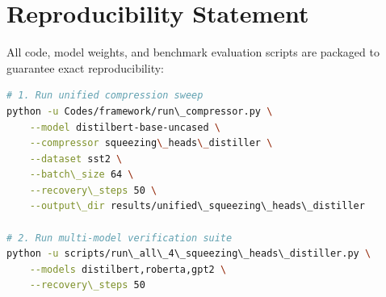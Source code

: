 \section{Reproducibility Statement}
All code, model weights, and benchmark evaluation scripts are packaged to guarantee exact reproducibility:
\begin{lstlisting}[language=bash]
# 1. Run unified compression sweep
python -u Codes/framework/run\_compressor.py \
    --model distilbert-base-uncased \
    --compressor squeezing\_heads\_distiller \
    --dataset sst2 \
    --batch\_size 64 \
    --recovery\_steps 50 \
    --output\_dir results/unified\_squeezing\_heads\_distiller

# 2. Run multi-model verification suite
python -u scripts/run\_all\_4\_squeezing\_heads\_distiller.py \
    --models distilbert,roberta,gpt2 \
    --recovery\_steps 50
\end{lstlisting}
